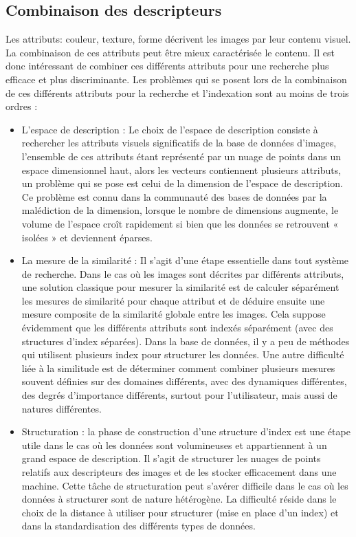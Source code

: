 \subsection{Combinaison des descripteurs}

Les attributs: couleur, texture, forme décrivent les images par leur contenu visuel. La
combinaison de ces attributs peut être mieux caractérisée le contenu. Il est donc intéressant de
combiner ces différents attributs pour une recherche plus efficace et plus discriminante. Les
problèmes qui se posent lors de la combinaison de ces différents attributs pour la recherche et
l’indexation sont au moins de trois ordres :
\begin{itemize}
	\item L'espace de description : Le choix de l'espace de description consiste à rechercher les
	attributs visuels significatifs de la base de données d'images, l'ensemble de ces
	attributs étant représenté par un nuage de points dans un espace dimensionnel haut,
	alors les vecteurs contiennent plusieurs attributs, un problème qui se pose est celui de
	la dimension de l'espace de description. Ce problème est connu dans la communauté
	des bases de données par la malédiction de la dimension, lorsque le nombre de
	dimensions augmente, le volume de l'espace croît rapidement si bien que les données
	se retrouvent « isolées » et deviennent éparses.
	\item La mesure de la similarité : Il s'agit d'une étape essentielle dans tout système de
	recherche. Dans le cas où les images sont décrites par différents attributs, une solution
	classique pour mesurer la similarité est de calculer séparément les mesures de
	similarité pour chaque attribut et de déduire ensuite une mesure composite de la
	similarité globale entre les images. Cela suppose évidemment que les différents
	attributs sont indexés séparément (avec des structures d'index séparées). Dans la base de données, il y a peu de méthodes qui utilisent plusieurs index pour structurer les
	données. Une autre difficulté liée à la similitude est de déterminer comment combiner
	plusieurs mesures souvent définies sur des domaines différents, avec des dynamiques
	différentes, des degrés d'importance différents, surtout pour l'utilisateur, mais aussi de
	natures différentes.
	\item Structuration : la phase de construction d'une structure d'index est une étape utile dans
	le cas où les données sont volumineuses et appartiennent à un grand espace de
	description. Il s'agit de structurer les nuages de points relatifs aux descripteurs des
	images et de les stocker efficacement dans une machine. Cette tâche de structuration
	peut s'avérer difficile dans le cas où les données à structurer sont de nature hétérogène.
	La difficulté réside dans le choix de la distance à utiliser pour structurer (mise en place
	d'un index) et dans la standardisation des différents types de données.
\end{itemize}


